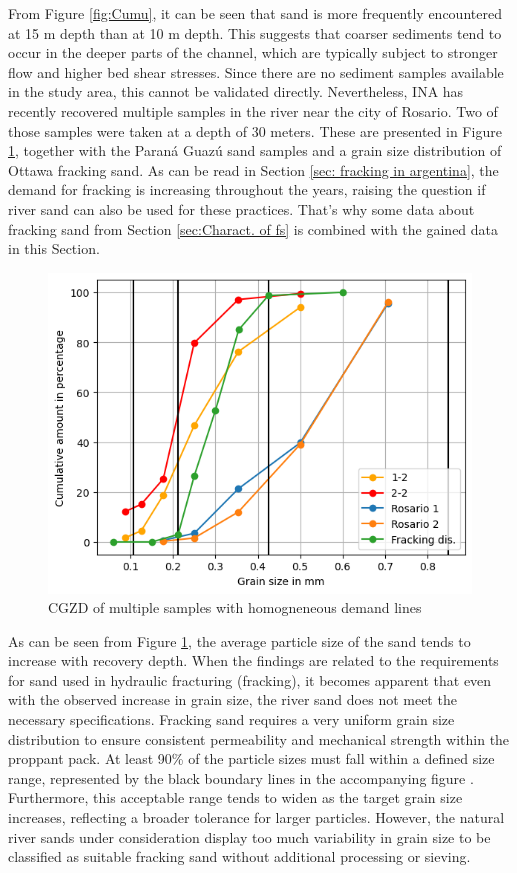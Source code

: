 From Figure \ref{fig:Cumu}, it can be seen that sand is more frequently encountered at 15 m depth than at 10 m depth. This suggests that coarser sediments tend to occur in the deeper parts of the channel, which are typically subject to stronger flow and higher bed shear stresses. Since there are no sediment samples available in the study area, this cannot be validated directly. Nevertheless, INA has recently recovered multiple samples in the river near the city of Rosario. Two of those samples were taken at a depth of 30 meters. These are presented in Figure \ref{fig:rd}, together with the Paraná Guazú sand samples and a grain size distribution of Ottawa fracking sand. As can be read in Section \ref{sec: fracking in argentina}, the demand for fracking is increasing throughout the years, raising the question if river sand can also be used for these practices.
That's why some data about fracking sand from Section \ref{sec:Charact. of fs} is combined with the gained data in this Section. 

\begin{figure}[H]
    \centering
    \includegraphics[width=0.75\linewidth]{figures//ch6/comparison2.png}
    \caption{CGZD of multiple samples with homogneneous demand lines \autocite{bensonFracSandUnited2015}}
    \label{fig:rd}
\end{figure}

As can be seen from Figure \ref{fig:rd}, the average particle size of the sand tends to increase with recovery depth. When the findings are related to the requirements for sand used in hydraulic fracturing (fracking), it becomes apparent that even with the observed increase in grain size, the river sand does not meet the necessary specifications. Fracking sand requires a very uniform grain size distribution to ensure consistent permeability and mechanical strength within the proppant pack. At least 90\% of the particle sizes must fall within a defined size range, represented by the black boundary lines in the accompanying figure \autocite{bensonFracSandUnited2015}.
Furthermore, this acceptable range tends to widen as the target grain size increases, reflecting a broader tolerance for larger particles. However, the natural river sands under consideration display too much variability in grain size to be classified as suitable fracking sand without additional processing or sieving.

